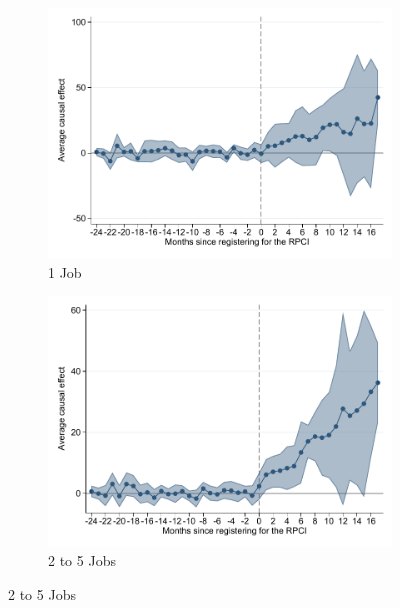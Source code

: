 \documentclass[oneside,11pt]{article}
\begin{document}
\begin{figure}[H]
    \caption{Event studies - RPCI effect on wage by firm size}
    \label{event_study_firm_size}
    \begin{center}
    
    \begin{subfigure}{0.49\textwidth}
    \caption{1 Job}
    \includegraphics[width=\textwidth]{04_Figures/muestra_10porciento/event_study_sal_cierre_chaisemartin_firm_size_1.pdf}
    \end{subfigure}
    \begin{subfigure}{0.49\textwidth}
    \caption{2 to 5 Jobs}
    \includegraphics[width=\textwidth]{04_Figures/muestra_10porciento/event_study_sal_cierre_chaisemartin_firm_size_2.pdf}
    \end{subfigure}
    

\end{center}
\end{figure}
\end{document}
